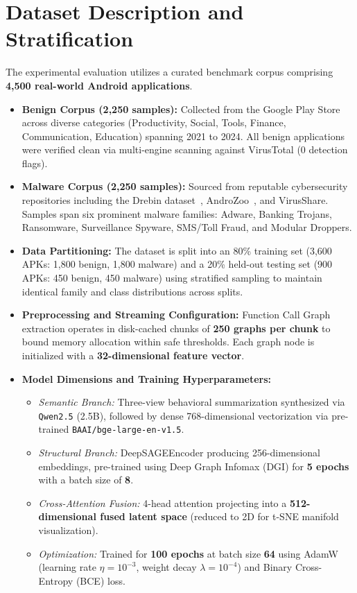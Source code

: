 \documentclass[12pt,a4paper,oneside]{report}
\begin{document}
\section{Dataset Description and Stratification}
The experimental evaluation utilizes a curated benchmark corpus comprising \textbf{4,500 real-world Android applications}. 
\begin{itemize}
    \item \textbf{Benign Corpus (2,250 samples):} Collected from the Google Play Store across diverse categories (Productivity, Social, Tools, Finance, Communication, Education) spanning 2021 to 2024. All benign applications were verified clean via multi-engine scanning against VirusTotal (0 detection flags).
    \item \textbf{Malware Corpus (2,250 samples):} Sourced from reputable cybersecurity repositories including the Drebin dataset~\cite{ref1}, AndroZoo~\cite{ref11}, and VirusShare. Samples span six prominent malware families: Adware, Banking Trojans, Ransomware, Surveillance Spyware, SMS/Toll Fraud, and Modular Droppers.
    \item \textbf{Data Partitioning:} The dataset is split into an 80\% training set (3,600 APKs: 1,800 benign, 1,800 malware) and a 20\% held-out testing set (900 APKs: 450 benign, 450 malware) using stratified sampling to maintain identical family and class distributions across splits.
    \item \textbf{Preprocessing and Streaming Configuration:} Function Call Graph extraction operates in disk-cached chunks of \textbf{250 graphs per chunk} to bound memory allocation within safe thresholds. Each graph node is initialized with a \textbf{32-dimensional feature vector}.
    \item \textbf{Model Dimensions and Training Hyperparameters:}
    \begin{itemize}
        \item \textit{Semantic Branch:} Three-view behavioral summarization synthesized via \texttt{Qwen2.5} (2.5B), followed by dense 768-dimensional vectorization via pre-trained \texttt{BAAI/bge-large-en-v1.5}.
        \item \textit{Structural Branch:} DeepSAGEEncoder producing 256-dimensional embeddings, pre-trained using Deep Graph Infomax (DGI) for \textbf{5 epochs} with a batch size of \textbf{8}.
        \item \textit{Cross-Attention Fusion:} 4-head attention projecting into a \textbf{512-dimensional fused latent space} (reduced to 2D for t-SNE manifold visualization).
        \item \textit{Optimization:} Trained for \textbf{100 epochs} at batch size \textbf{64} using AdamW (learning rate $\eta = 10^{-3}$, weight decay $\lambda = 10^{-4}$) and Binary Cross-Entropy (BCE) loss.
    \end{itemize}
\end{itemize}
\end{document}
